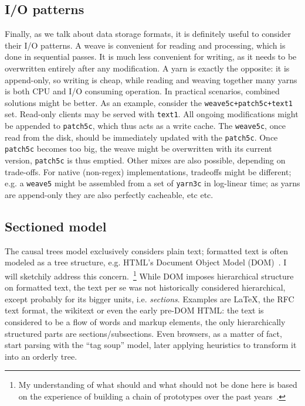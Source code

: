 \documentclass{sig-alternate}
\begin{document}
\subsection{I/O patterns}	\label{sec:io}

Finally, as we talk about data storage formats, it is definitely useful to consider their I/O patterns.
A weave is convenient for reading and processing, which is done in sequential passes.
It is much less convenient for writing, as it needs to be overwritten entirely after any modification.
A yarn is exactly the opposite: it is append-only, so writing is cheap, while reading and weaving together many yarns is both CPU and I/O consuming operation.
In practical scenarios, combined solutions might be better.
As an example, consider the {\tt weave5c+patch5c+text1} set.
Read-only clients may be served with {\tt text1}.
All ongoing modifications might be appended to {\tt patch5c}, which thus acts as a write cache.
The {\tt weave5c}, once read from the disk, should be immediately  updated with the {\tt patch5c}.
Once {\tt patch5c} becomes too big, the weave might be overwritten with its current version, {\tt patch5c} is thus emptied.
Other mixes are also possible, depending on trade-offs.
For native (non-regex) implementations, tradeoffs might be different; e.g. a {\tt weave5} might be assembled from a set of {\tt yarn3c} in log-linear time; as yarns are append-only they are also perfectly cacheable, etc etc.

\subsection{Sectioned model}	\label{sec:sec}

The causal trees model exclusively considers plain text; formatted text is often modeled as a tree structure, e.g. HTML's Document Object Model (DOM)~\cite{dom}.
I will sketchily address this concern.~\footnote{My understanding of what should and what should not be done here is based on the experience of building a chain of prototypes over the past years~\cite{www06,csr07,wikisym08}.} 
While DOM imposes hierarchical structure on formatted text, the text per se was not historically considered hierarchical, except probably for its bigger units, i.e. \emph{sections}. 
Examples are LaTeX, the RFC text format, the wikitext or even the early pre-DOM HTML: the text is considered to be a flow of words and markup elements, the only hierarchically structured parts are sections/subsections.
Even browsers, as a matter of fact, start parsing with the ``tag soup'' model, later applying heuristics to transform it into an orderly tree. 
\end{document}
